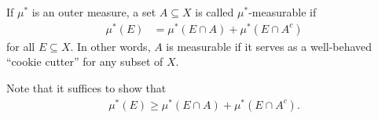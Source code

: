 \documentclass[10pt]{mypackage}
\begin{document}
\begin{definition}
  If $\mu^{\ast}$ is an outer measure, a set $A\subseteq X$ is called $\mu^{\ast}$-measurable if
  \begin{align*}
    \mu^{\ast}\left(E\right) &= \mu^{\ast}\left(E\cap A\right) + \mu^{\ast}\left(E\cap A^{c}\right)
  \end{align*}
  for all $E\subseteq X$. In other words, $A$ is measurable if it serves as a well-behaved ``cookie cutter'' for any subset of $X$.\newline

  Note that it suffices to show that
  \begin{align*}
    \mu^{\ast}\left(E\right) \geq \mu^{\ast}\left(E\cap A\right) + \mu^{\ast}\left(E\cap A^{c}\right).
  \end{align*}
\end{definition}
\end{document}
